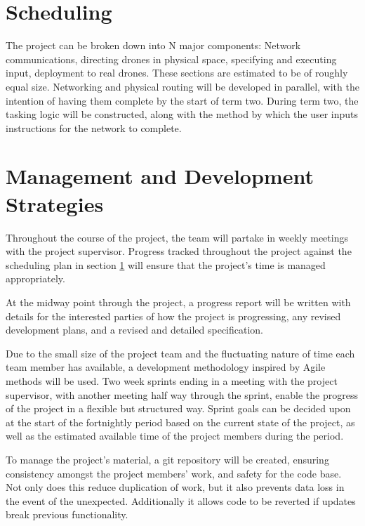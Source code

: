 \documentclass[10pt,a4paper]{article}
\begin{document}
    \section{Scheduling}
    \label{scheduling}
    The project can be broken down into N major components: Network communications, directing drones in physical space, specifying and executing input, deployment to real drones. These sections are estimated to be of roughly equal size. Networking and physical routing will be developed in parallel, with the intention of having them complete by the start of term two. During term two, the tasking logic will be constructed, along with the method by which the user inputs instructions for the network to complete.
	
	\section{Management and Development Strategies}
	
	Throughout the course of the project, the team will partake in weekly meetings with the project supervisor. Progress tracked throughout the project against the scheduling plan in section \ref{scheduling} will ensure that the project's time is managed appropriately.
	
	At the midway point through the project, a progress report will be written with details for the interested parties of how the project is progressing, any revised development plans, and a revised and detailed specification.
	
    Due to the small size of the project team and the fluctuating nature of time each team member has available, a development methodology inspired by Agile methods will be used. Two week sprints ending in a meeting with the project supervisor, with another meeting half way through the sprint, enable the progress of the project in a flexible but structured way. Sprint goals can be decided upon at the start of the fortnightly period based on the current state of the project, as well as the estimated available time of the project members during the period.
    
    To manage the project's material, a git repository will be created, ensuring consistency amongst the project members' work, and safety for the code base. Not only does this reduce duplication of work, but it also prevents data loss in the event of the unexpected. Additionally it allows code to be reverted if updates break previous functionality.
	
    
    
\end{document}
